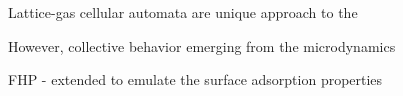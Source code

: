 Lattice-gas cellular automata are unique approach to the 


However, collective behavior emerging from the microdynamics

FHP - extended to emulate the surface adsorption properties